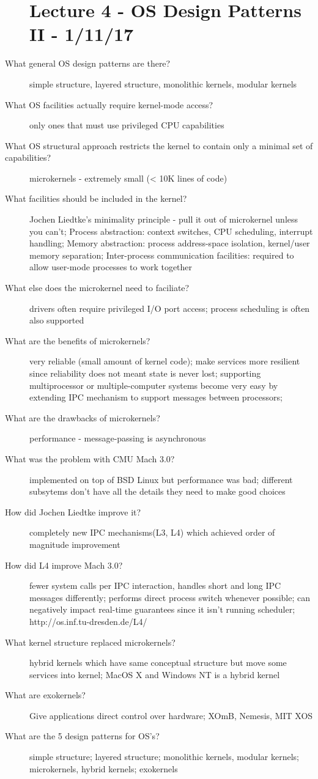 \documentclass[10pt]{article}
\begin{document}
\begin{description}
\section{Lecture 4 - OS Design Patterns II - 1/11/17}
\item[What general OS design patterns are there?]
  simple structure, layered structure, monolithic kernels, modular kernels
\item[What OS facilities actually require kernel-mode access?]
  only ones that must use privileged CPU capabilities
\item[What OS structural approach restricts the kernel to contain only a minimal set of capabilities?]
  microkernels - extremely small (< 10K lines of code)
\item[What facilities should be included in the kernel?]
  Jochen Liedtke's minimality principle - pull it out of microkernel unless you can't;
  Process abstraction: context switches, CPU scheduling, interrupt handling;
  Memory abstraction: process address-space isolation, kernel/user memory separation;
  Inter-process communication facilities: required to allow user-mode processes to work together
\item[What else does the microkernel need to faciliate?]
  drivers often require privileged I/O port access; process scheduling is often also supported
\item[What are the benefits of microkernels?]
  very reliable (small amount of kernel code);
  make services more resilient since reliability does not meant state is never lost;
  supporting multiprocessor or multiple-computer systems become very easy by extending IPC mechanism to support messages between processors;
\item[What are the drawbacks of microkernels?]
  performance - message-passing is asynchronous
\item[What was the problem with CMU Mach 3.0?]
  implemented on top of BSD Linux but performance was bad;
  different subsytems don't have all the details they need to make good choices
\item[How did Jochen Liedtke improve it?]
  completely new IPC mechanisms(L3, L4) which achieved order of magnitude improvement
\item[How did L4 improve Mach 3.0?]
  fewer system calls per IPC interaction, handles short and long IPC messages differently;
  performs direct process switch whenever possible;
  can negatively impact real-time guarantees since it isn't running scheduler;
  http://os.inf.tu-dresden.de/L4/
\item[What kernel structure replaced microkernels?]
  hybrid kernels which have same conceptual structure but move some services into kernel;
  MacOS X and Windows NT is a hybrid kernel
\item[What are exokernels?]
  Give applications direct control over hardware;
  XOmB, Nemesis, MIT XOS
\item[What are the 5 design patterns for OS's?]
  simple structure; layered structure;
  monolithic kernels, modular kernels;
  microkernels, hybrid kernels;
  exokernels
\end{description}
\end{document}
